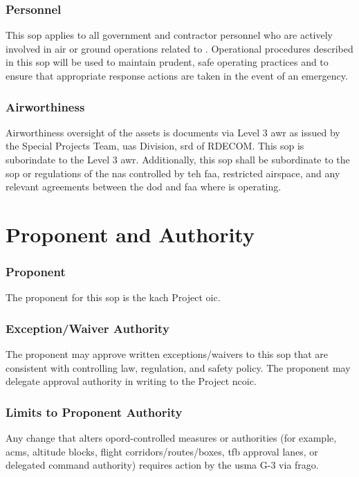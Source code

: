         \subsubsection{Personnel}This \ac{sop} applies to all government and contractor personnel who are actively involved in air or ground operations related to \projectmars{}.  Operational procedures described in this \ac{sop} will be used to maintain prudent, safe operating practices and to ensure that appropriate response actions are taken in the event of an emergency.

        \subsubsection{Airworthiness} Airworthiness oversight of the \projectmars{} assets is documents via Level 3 \ac{awr} as issued by the Special Projects Team, \ac{uas} Division, \ac{srd} of RDECOM.  This \ac{sop} is suborindate to the Level 3 \ac{awr}.  Additionally, this \ac{sop} shall be subordinate to the \ac{sop} or regulations of the \ac{nas} controlled by teh \ac{faa}, restricted airspace, and any relevant agreements between the \ac{dod} and \ac{faa} where \projectmars{} is operating.

\section{Proponent and Authority}
        \subsubsection{Proponent}The proponent for this \ac{sop} is the \ac{kach} Project \ac{oic}.
\\
        \subsubsection{Exception/Waiver Authority}The proponent may approve written exceptions/waivers to this \ac{sop} that are consistent with controlling law, regulation, and safety policy. The proponent may delegate approval authority in writing to the Project \ac{ncoic}.
\\
        \subsubsection{Limits to Proponent Authority}Any change that alters \ac{opord}-controlled measures or authorities (for example, \ac{acm}s, altitude blocks, flight corridors/routes/boxes, \ac{tfb} approval lanes, or delegated command authority) requires action by the \ac{usma} G-3 via \ac{frago}.
\\
